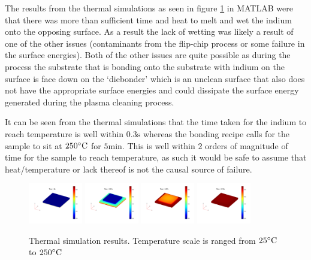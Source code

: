 The results from the thermal simulations as seen in figure \ref{fig:thermal_simulations} in MATLAB were that there was more than sufficient time and heat to melt and wet the indium onto the opposing surface. As a result the lack of wetting was likely a result of one of the other issues (contaminants from the flip-chip process or some failure in the surface energies).
Both of the other issues are quite possible as during the process the substrate that is bonding onto the substrate with indium on the surface is face down on the `diebonder' which is an unclean surface that also does not have the appropriate surface energies and could dissipate the surface energy generated during the plasma cleaning process.

It can be seen from the thermal simulations that the time taken for the indium to reach temperature is well within $0.3 \unit{\second}$ whereas the bonding recipe calls for the sample to sit at $250 \dC$ for $5 \unit{\minute}$. This is well within 2 orders of magnitude of time for the sample to reach temperature, as such it would be safe to assume that heat/temperature or lack thereof is not the causal source of failure.


\begin{figure}
    \centering
    \includegraphics[width=0.21\textwidth]{Main/Ch2/heat/001.png}
    \includegraphics[width=0.21\textwidth]{Main/Ch2/heat/002.png}
    \includegraphics[width=0.21\textwidth]{Main/Ch2/heat/008.png}
    \includegraphics[width=0.21\textwidth]{Main/Ch2/heat/020.png}
    \caption{Thermal simulation results. Temperature scale is ranged from $25 \dC$ to $250 \dC$}
    \label{fig:thermal_simulations}
\end{figure}


